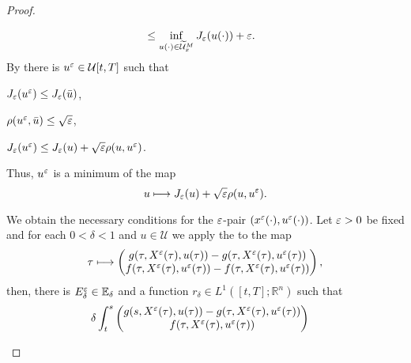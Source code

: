 \begin{proof}
\begin{asparaenum}
\begin{align*}
                &\leq \inf_{u(\cdot) \in \mathcal{\widetilde{U}}_x^{M}}J_{\veps}(u(\cdot)) %
                + \veps.
        \end{align*}
        By  there is $u^{\varepsilon} \in \mathcal{U}[t,T]$ 
        such that
        \begin{asparaenum}
            \item
                $J_{\varepsilon}(u^{\varepsilon}) \leq J_{\varepsilon}(\Bar{u})$,
            \item
                $\rho(u^{\varepsilon}, \Bar{u}) \leq \sqrt{\varepsilon}$,
            \item
                $J_{\veps}(u^{\veps}) \leq J_{\veps}(u)%
                + \sqrt{\veps}\rho(u, u^{\veps})$.
        \end{asparaenum}
        Thus, $u^{\varepsilon}$ is a minimum of the map 
        \begin{equation*}
            u \longmapsto J_{\veps}(u) + %
            \sqrt{\veps}\rho(u, u^{\veps}).
        \end{equation*}
        \item We obtain the necessary conditions for the $\varepsilon$-pair 
        $(x^{\varepsilon}(\cdot), u^{\varepsilon}(\cdot))$. Let $\varepsilon>0$ be fixed and for
        each $0<\delta<1$ and $u\in \mathcal{U}$ we apply the 
        to the map
        \begin{equation*}
            \tau \longmapsto %
            \begin{pmatrix}
                g(\tau, X^{\veps}(\tau), u(\tau)) %
                    - g(\tau, X^{\veps}(\tau), u^{\veps}(\tau)) \\
                f(\tau, X^{\veps}(\tau), u^{\veps}(\tau)) %
                    - f(\tau, X^{\veps}(\tau), u^{\veps}(\tau)) 
            \end{pmatrix},
        \end{equation*}
        then, there is $E_\delta^{\varepsilon} \in \mathbb{E}_{\delta}$ and
        a function $ r_\delta \in L^{1}([t,T] ; \mathbb{R}^{n}) $ such that 
        \begin{align*}
            \delta  &\int_{t}^{s} %
            \begin{pmatrix}
                g(s, X^{\veps}(\tau), u(\tau)) %
                    - g(\tau, X^{\veps}(\tau), u^{\veps}(\tau)) \\
                f(\tau, X^{\veps}(\tau), u^{\veps}(\tau)) %

\end{pmatrix}
\end{align*}
\end{asparaenum}
\end{proof}

